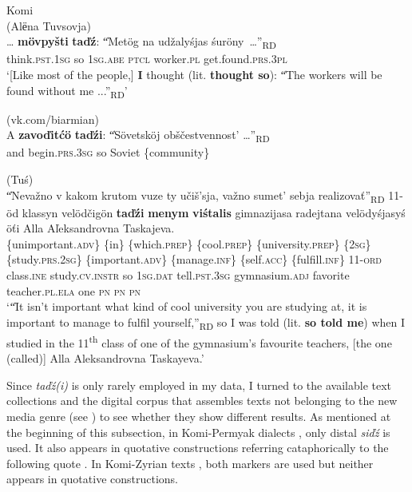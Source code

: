 \documentclass[output=paper,colorlinks,citecolor=brown]{langscibook}
\begin{document}
\ea\label{ex:teptiuk:18} {Komi}\\
\ea\label{ex:teptiuk:18a} (Alёna Tuvsovja)\\
\gll … \textbf{mövpyšti} \textbf{taďź}: \|“Metög na udžalyśjas śuröny~…”\|\textsubscript{RD}\\
{} think.\textsc{pst.1sg} so {\db}{\db}1\textsc{sg.abe} \textsc{ptcl} worker.\textsc{pl}  get.found.\textsc{prs.3pl}\\
\glt ‘[Like most of the people,] \textbf{I} thought (lit. \textbf{thought so}): \|“The workers will be found without me ...”\|\textsubscript{RD}’

\ex\label{ex:teptiuk:18b} (vk.com/biarmian)\\
\gll A \textbf{zavoďitćö} \textbf{taďźi}: \|“Sövetsköj obščestvennost’ …”\|\textsubscript{RD}\\
and begin.\textsc{prs.3sg} so {\db}{\db}Soviet \{community\}\\

\ex\label{ex:teptiuk:18c} (Tuś)\\
\gll \|“Nevažno v kakom krutom vuze ty učiš’sja, važno sumet’ sebja realizovať”\|\textsubscript{RD} 11-öd klassyn velödčigön \textbf{taďźi} \textbf{menym} \textbf{viśtalis} gimnazijasa radejtana velödyśjasyś öťi Alla Aľeksandrovna Taskajeva. \\
{\db}{\db}\{unimportant.\textsc{adv}\} \{in\} \{which.\textsc{prep}\} \{cool.\textsc{prep}\} \{university.\textsc{prep}\} \{2\textsc{sg}\} \{study.\textsc{prs.2sg}\} \{important.\textsc{adv}\} \{manage.\textsc{inf}\} \{self.\textsc{acc}\} \{fulfill\textsc{.inf}\} 11-\textsc{ord} class.\textsc{ine} study.\textsc{cv.instr} so  1\textsc{sg.dat} tell.\textsc{pst.3sg} gymnasium.\textsc{adj} favorite teacher.\textsc{pl.ela} one \textsc{pn} \textsc{pn} \textsc{pn}\\
\glt ‘\|“It isn’t important what kind of cool university you are studying at, it is important to manage to fulfil yourself,”\|\textsubscript{RD} so I was told (lit. \textbf{so told me}) when I studied in the 11\textsuperscript{th} class of one of the gymnasium’s favourite teachers, [the one (called)] Alla Aleksandrovna Taskayeva.’
\z
\z

Since \textit{taďź(i)} is only rarely employed in my data, I turned to the available text collections \citep{Uotila1985,Uotila1989} and the digital corpus that assembles texts not belonging to the new media genre (see ) to see whether they show different results. As mentioned at the beginning of this subsection, in Komi-Permyak dialects \citep{Uotila1985}, only distal \textit{siďź} is used. It also appears in quotative constructions referring cataphorically to the following quote . In Komi-Zyrian texts \citep{Uotila1989}, both markers are used but neither appears in quotative constructions.
\end{document}
